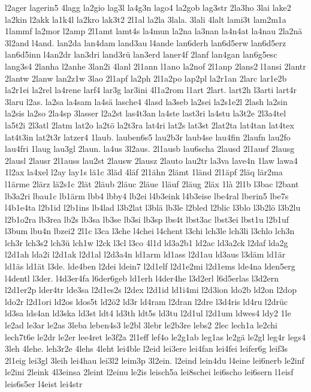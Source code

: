 {l2ager
lagerin5
4lagg
la2gio
lag3l
la4g3n
lago4
la2gob
lag3str
2la3ho
3lai
lake2
la2kin
l2akk
la1k4l
la2kro
lak3t2
2l1al
la2la
3lala.
3lali
4lalt
lami3t
lam2m1a
1lammf
la2mor
l2amp
2l1amt
lamt4s
la4mun
la2na
la3nan
la4n4at
la4nau
2la2nä
3l2and
l4and.
lan2da
lan4dam
land3au
l4ande
lan6derh
lan6d5erw
lan6d5erz
lan6d5inn
l4an2dr
lan3dri
land3rü
lan3erd
laner4f
2lanf
lan4gan
lan6g5esc
lang3s4
2lanha
l2anhe
3lan2i
4lanl
2l1ann
l1ano
la2nof
2l1anp
2lans2
l1ansi
2lantr
2lantw
2lanw
lan2z1w
3lao
2l1apf
la2ph
2l1a2po
lap2pl
la2r1an
2larc
lar1e2b
la2r1ei
la2rel
la4rene
larf4
lar3g
lar3ini
4l1a2rom
l1art
2lart.
lart2h
l3arti
lart4r
3laru
l2as.
la2sa
la4sam
la4sä
lasche4
4lasd
la3seb
la2sei
la2s1e2l
2lash
la2sin
la2sis
la2so
2la4sp
3lasser
l2a2st
las4t3an
la4ste
last3ri
la4stu
la3t2e
2l3a4tel
la5t2i
2l3atl
2latm
lat2o
la2tö
la2t3ra
lat4ri
lat2s
lat3st
2lat2ta
lat4tan
lat4tex
lat4t3in
lat2t3r
latzer4
1laub.
lauben6s5
lau2b3r
laub4se
lau4fin
2laufn
lau2fo
lau4fri
1laug
lau3gl
2laun.
la4us
3l2aus.
2l1ausb
lau6scha
2lausd
2l1ausf
2lausg
2lausl
2lausr
2l1auss
lau2st
2lausw
2lausz
2lauto
lau2tr
la3va
lave4n
1law
lawa4
1l2ax
la4xel
l2ay
lay1s
lä1c
3läd
4läf
2l1ähn
2lämt
1länd
2l1äpf
2läq
lär2ma
l1ärme
2lärz
lä2s1c
2lät
2läub
2läuc
2läue
1läuf
2läug
2läx
1là
2l1b
l3bac
l2bant
lb3a2ri
lbau1c
lb1ärm
lbb4
lbby4
lb2ei
l4b3eink
l4b3eise
lbe4ral
lberin5
lbe7s
l4b1e4ta
l2b1id
l2b1ins
lb4lad
l3b2lat
l3blä
lb3le
l2bled
l2blic
l3blo
l3b2lö
l3b2lu
l2b1o2ra
lb3rea
lb2s
lb3sa
lb3se
lb3si
lb3sp
lbs4t
lbst3ac
lbst3ei
lbst1u
l2b1uf
l3bum
lbu4n
lbzei2
2l1c
l3ca
l3che
l4chei
l4chent
l3chi
lch3le
lch3li
l3chlo
lch3n
lch3r
lch3s2
lch3ü
lch1w
l2ck
l3cl
l3co
4l1d
ld3a2b1
ld2ac
ld3a2ck
l2daf
lda2g
l2d1ah
lda2i
l2d1ak
l2d1al
l2d3a4n
ld1arm
ld1ass
l2d1au
ld3aus
l3däm
ld1är
ld1äs
ld1ät
l3de.
lde4ben
l2dei
ldein7
l2d1elf
l2d1e2mi
l2d1ems
lde4na
lden5erg
l4dentl
l3der.
l4d3er4fa
l6der6geb
ld1erh
l4der4he
l3d2erl
l6d5erlas
l3d2ern
l2d1er2p
lder4tr
lde3sa
l2d1es2s
l2dex
l2d1id
ld1i4mi
l2d3ion
ldo2b
ld2on
l2dop
ldo2r
l2d1ori
ld2os
ldos5t
ld2ö2
ld3r
ld4ram
l2dran
l2dre
l3d4ris
ld4ru
l2drüc
ld3sa
lds4an
ld3ska
ld3st
ldt4
ld3th
ldt5s
ld3tu
l2d1ul
l2d1um
ldwes4
ldy2
1le
le2ad
le3ar
le2as
3leba
leben4s3
le2bl
3lebr
le2b3re
lebs2
2lec
lech1a
le2chi
lech7t6e
le2dr
le2er
lee4ret
le3f2a
2l1eff
lef4o
le2g1ab
leg1as
le2gä
le2gl
leg4r
legs4
3leh
4lehe.
leh3r2e
4lehs
4leht
lei4ble
l2eid
lei3ere
lei4fan
lei4fei
leifer6g
leif3s
2l1eig
lei3gl
3leih
lei4hau
lei3l2
leim3p
3l2ein.
l2eind
lein4du
l4eine
lei6nerb
le2inf
le2ini
2leink
4l3einsa
2leint
l2einu
le2is
leisch5a
lei8schei
lei6scho
lei6sern
l1eisf
leis6s5er
l4eist
lei4str
}
